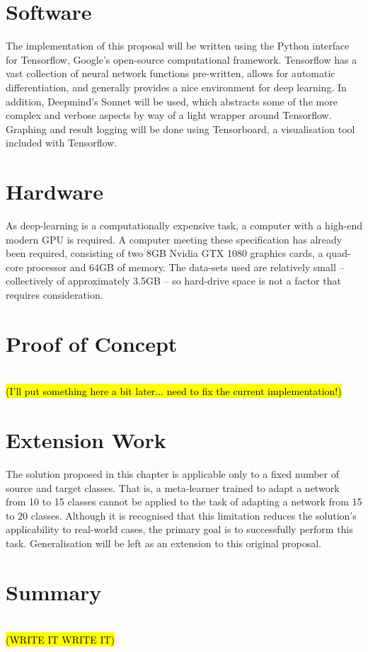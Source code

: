 \documentclass{report}
\newcommand{\TODO}[1]{\sethlcolor{pink}\hl{\\(#1)\\}}
\begin{document}
	
	\section{Software}
	The implementation of this proposal will be written using the Python interface for Tensorflow\parencite{tensorflow}, Google's open-source computational framework. Tensorflow has a vast collection of neural network functions pre-written, allows for automatic differentiation, and generally provides a nice environment for deep learning. In addition, Deepmind's Sonnet\parencite{sonnet} will be used, which abstracts some of the more complex and verbose aspects by way of a light wrapper around Tensorflow. Graphing and result logging will be done using Tensorboard, a visualisation tool included with Tensorflow. \par
	
	\section{Hardware}
	As deep-learning is a computationally expensive task, a computer with a high-end modern GPU is required. A computer meeting these specification has already been required, consisting of two 8GB Nvidia GTX 1080 graphics cards, a quad-core processor and 64GB of memory. The data-sets used are relatively small -- collectively of approximately 3.5GB -- so hard-drive space is not a factor that requires consideration.  \par
	
	\section{Proof of Concept}
	\TODO{I'll put something here a bit later... need to fix the current implementation!}
	
	\section{Extension Work}
	The solution proposed in this chapter is applicable only to a fixed number of source and target classes. That is, a meta-learner trained to adapt a network from 10 to 15 classes cannot be applied to the task of adapting a network from 15 to 20 classes. Although it is recognised that this limitation reduces the solution's applicability to real-world cases, the primary goal is to successfully perform this task. Generalisation will be left as an extension to this original proposal. \par
	
	\section{Summary}	
	\TODO{WRITE IT WRITE IT}

	\printbibliography
	
	
\end{document}
